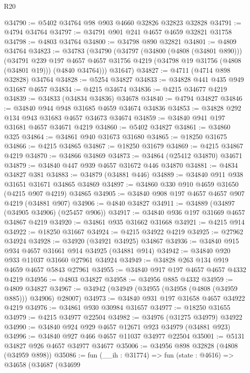 \begin{lexlean}{R20}
\begin{coremodule}
@34790 := @5402 @34764 @98 @903 @4660 @32826 @32823 @32828
@34791 := @4794 @34764
@34797 := @34791 @901 @241 @4657 @4659 @32821 @31758
@34798 := @4803 @34764
@34800 := @34798 @890 @32821
@34801 := @4809 @34764
@34823 := @34783
    (@34790
      (@34797
        (@34800 (@4808 (@34801 @890)))
        (@34791
          @239
          @197
          @4657
          @4657
          @31756
          @4219
          (@34798 @19 @31756 (@4808 (@34801 @19)))
          (@4840 @34764)))
      @31647)
@34827 := @4711 (@4714 @898 @32828) @34764
@34828 := @5254 @34827
@34833 := @34828 @441 @435 @949 @31687 @4657
@34834 := @4215 @34674
@34836 := @4215 @34677 @4219
@34839 := @34833 (@34834 @34836) @34678
@34840 := @4794 @34827
@34846 := @34840 @944 @948 @31685 @4659 @34674 @34836
@34853 := @34828 @292 @134 @943 @31683 @4657 @34673 @34674
@34859 := @34840 @941 @197 @31681 @4657 @34671 @4219
@34860 := @5402 @34827
@34861 := @34860 @325
@34864 := @34861 @940 @31673 @31680
@34865 := @18250 @31675
@34866 := @4215 @34865
@34867 := @18250 @31679
@34869 := @4215 @34867 @4219
@34870 := @34866 @34869
@34873 := @34864 (@25412 @34870) @34671
@34879 := @34840 @447 @939 @4657 @31672 @446 @34870
@34881 := @4834 @34827 @381
@34883 := @34879 (@34881 @446)
@34889 := @34840 @911 @938 @31651 @31671 @34865 @34869
@34897 := @34860 @330 @910 @4659 @31650 (@4215 @907 @4219) @34865
@34905 := @34840 @908 @197 @4657 @4657 @907 @4219 (@34881 @907)
@34906 := @4840 @34827
@34911 := @34889 (@34897 (@34905 @34906) (@25457 @906))
@34917 := @34840 @936 @197 @31669 @4657 @34867 @4219
@34920 := @34861 @935 @31662 @31668
@34921 := @4215 @914
@34922 := @18250 @31667
@34924 := @4215 @34922 @4219
@34925 := @27962 @34924
@34928 := @34920 (@34921 @34925) @34867
@34936 := @34840 @915 @934 @4657 @31661 @914 @34925 (@34881 @914)
@34942 := @34840 @920 @933 @11037 @31660 @27961 @34924
@34949 := @34828 @263 @134 @919 @4659 @4657 @5843 @27961
@34955 := @34840 @917 @197 @4657 @4657 @4332 @4219
@34956 := @4803 @34827
@34958 := @34956 @885 @4332
@34959 := @4809 @34827
@34967 := @34942 (@34949 (@34955 (@34958 (@4808 (@34959 @885))) @34906) @28007)
@34973 := @34840 @931 @197 @31658 @4657 @34922 @4219
@34976 := @34861 @930 @30984 @31657
@34977 := @18250 @31655
@34979 := @4215 @34977 @22504
@34982 := @34976 (@31275 @34979) @34922
@34990 := @34840 @924 @929 @4657 @12671 @923 @34979 (@34881 @923)
@34996 := @34840 @927 @466 @4657 @11037 @34977 @22504
@35001 := @5131 @34827 @926 @4657 @34977 @34677
@35006 := @34956 @898 @32828 (@4808 (@34959 @898))
@35086 := fun (__ih : @31774) =>
  fun (state : @4616) =>
  @34658
    (@34687
      (@34699

\end{coremodule}
\end{lexlean}
